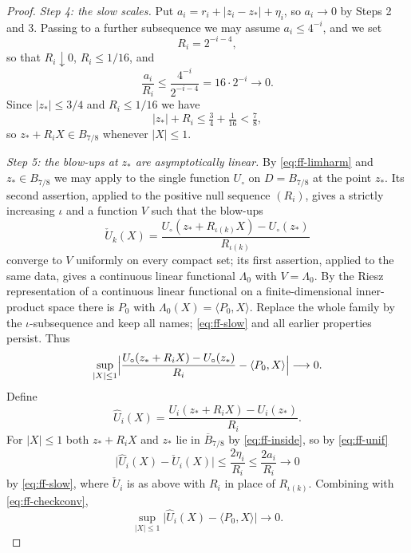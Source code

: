 \begin{proof}
\emph{Step 4: the slow scales.}
Put $a_i=r_i+|z_i-z_*|+\eta_i$, so $a_i\to0$ by Steps 2 and 3. Passing to a
further subsequence we may assume $a_i\le4^{-i}$, and we set
\[
  R_i=2^{-i-4},
\]
so that $R_i\downarrow0$, $R_i\le1/16$, and
\begin{equation}\label{eq:ff-slow}
  \frac{a_i}{R_i}\le\frac{4^{-i}}{2^{-i-4}}=16\cdot2^{-i}\longrightarrow0 .
\end{equation}
Since $|z_*|\le3/4$ and $R_i\le1/16$ we have
\begin{equation}\label{eq:ff-inside}
  |z_*|+R_i\le\tfrac34+\tfrac1{16}<\tfrac78,
\end{equation}
so $z_*+R_iX\in B_{7/8}$ whenever $|X|\le1$.

\emph{Step 5: the blow-ups at $z_*$ are asymptotically linear.}
By \eqref{eq:ff-limharm} and $z_*\in B_{7/8}$ we may apply
 to the single function $U_\circ$ on $D=B_{7/8}$ at the
point $z_*$. Its second assertion, applied to the positive null sequence
$(R_i)$, gives a strictly increasing $\iota$ and a function $V$ such that the
blow-ups
\[
  \check U_k(X)=\frac{U_\circ(z_*+R_{\iota(k)}X)-U_\circ(z_*)}{R_{\iota(k)}}
\]
converge to $V$ uniformly on every compact set; its first assertion, applied to
the same data, gives a continuous linear functional $\Lambda_0$ with
$V=\Lambda_0$. By the Riesz representation of a continuous linear functional on
a finite-dimensional inner-product space there is $P_0$ with
$\Lambda_0(X)=\langle P_0,X\rangle$. Replace the whole family by the
$\iota$-subsequence and keep all names; \eqref{eq:ff-slow} and all earlier
properties persist. Thus
\begin{equation}\label{eq:ff-checkconv}
  \sup_{|X|\le1}\Bigl|
    \frac{U_\circ(z_*+R_iX)-U_\circ(z_*)}{R_i}-\langle P_0,X\rangle\Bigr|
  \longrightarrow0 .
\end{equation}
Define
\[
  \widehat U_i(X)=\frac{U_i(z_*+R_iX)-U_i(z_*)}{R_i}.
\]
For $|X|\le1$ both $z_*+R_iX$ and $z_*$ lie in $\overline B_{7/8}$ by
\eqref{eq:ff-inside}, so by \eqref{eq:ff-unif}
\[
  \bigl|\widehat U_i(X)-\check U_i(X)\bigr|
   \le\frac{2\eta_i}{R_i}\le\frac{2a_i}{R_i}\longrightarrow0
\]
by \eqref{eq:ff-slow}, where $\check U_i$ is as above with $R_i$ in place of
$R_{\iota(k)}$. Combining with \eqref{eq:ff-checkconv},
\begin{equation}\label{eq:ff-hatconv}
  \sup_{|X|\le1}\bigl|\widehat U_i(X)-\langle P_0,X\rangle\bigr|
  \longrightarrow0 .
\end{equation}


\end{proof}
